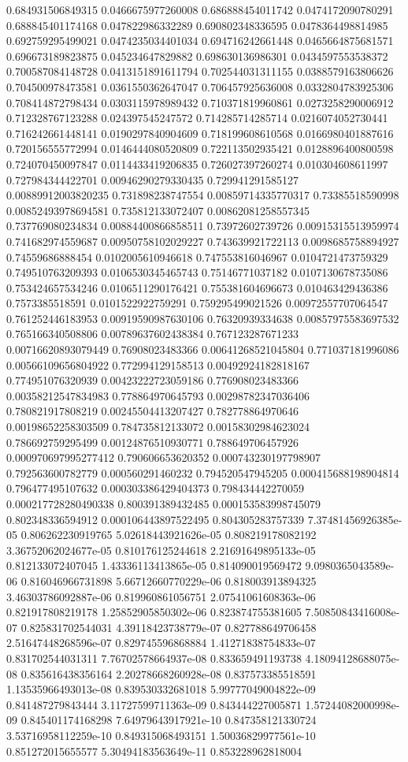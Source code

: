 \begin{table}
\begin{tabu}
\begin{sparkline}{10}
0.684931506849315 0.0466675977260008 0.686888454011742 0.0474172090780291 0.688845401174168 0.047822986332289 0.690802348336595 0.0478364498814985 0.692759295499021 0.0474235034401034 0.694716242661448 0.0465664875681571 0.696673189823875 0.045234647829882 0.698630136986301 0.0434597553538372 0.700587084148728 0.0413151891611794 0.702544031311155 0.0388579163806626 0.704500978473581 0.0361550362647047 0.706457925636008 0.0332804783925306 0.708414872798434 0.0303115978989432 0.710371819960861 0.0273258290006912 0.712328767123288 0.024397545247572 0.714285714285714 0.0216074052730441 0.716242661448141 0.0190297840904609 0.718199608610568 0.0166980401887616 0.720156555772994 0.0146444080520809 0.722113502935421 0.0128896400800598 0.724070450097847 0.0114433419206835 0.726027397260274 0.010304608611997 0.727984344422701 0.00946290279330435 0.729941291585127 0.00889912003820235 0.731898238747554 0.00859714335770317 0.73385518590998 0.00852493978694581 0.735812133072407 0.00862081258557345 0.737769080234834 0.00884400866858511 0.73972602739726 0.00915315513959974 0.741682974559687 0.00950758102029227 0.743639921722113 0.0098685758894927 0.74559686888454 0.0102005610946618 0.747553816046967 0.0104721473759329 0.749510763209393 0.0106530345465743 0.75146771037182 0.0107130678735086 0.753424657534246 0.0106511290176421 0.755381604696673 0.010463429436386 0.7573385518591 0.0101522922759291 0.759295499021526 0.00972557707064547 0.761252446183953 0.00919590987630106 0.76320939334638 0.00857975583697532 0.765166340508806 0.00789637602438384 0.767123287671233 0.00716620893079449 0.76908023483366 0.00641268521045804 0.771037181996086 0.00566109656804922 0.772994129158513 0.00492924182818167 0.774951076320939 0.00423222723059186 0.776908023483366 0.00358212547834983 0.778864970645793 0.00298782347036406 0.780821917808219 0.00245504413207427 0.782778864970646 0.00198652258303509 0.784735812133072 0.00158302984623024 0.786692759295499 0.00124876510930771 0.788649706457926 0.000970697995277412 0.790606653620352 0.000743230197798907 0.792563600782779 0.000560291460232 0.794520547945205 0.000415688198904814 0.796477495107632 0.000303386429404373 0.798434442270059 0.000217728280490338 0.800391389432485 0.000153583998745079 0.802348336594912 0.000106443897522495 0.804305283757339 7.37481456926385e-05 0.806262230919765 5.02618443921626e-05 0.808219178082192 3.36752062024677e-05 0.810176125244618 2.21691649895133e-05 0.812133072407045 1.43336113413865e-05 0.814090019569472 9.0980365043589e-06 0.816046966731898 5.66712660770229e-06 0.818003913894325 3.46303786092887e-06 0.819960861056751 2.07541061608363e-06 0.821917808219178 1.25852905850302e-06 0.823874755381605 7.50850843416008e-07 0.825831702544031 4.39118423738779e-07 0.827788649706458 2.51647448268596e-07 0.829745596868884 1.41271838754833e-07 0.831702544031311 7.76702578664937e-08 0.833659491193738 4.18094128688075e-08 0.835616438356164 2.20278668260928e-08 0.837573385518591 1.13535966493013e-08 0.839530332681018 5.99777049004822e-09 0.841487279843444 3.11727599711363e-09 0.843444227005871 1.57244082000998e-09 0.845401174168298 7.64979643917921e-10 0.847358121330724 3.53716958112259e-10 0.849315068493151 1.50036829977561e-10 0.851272015655577 5.30494183563649e-11 0.853228962818004 
\end{sparkline}
\end{tabu}
\end{table}
